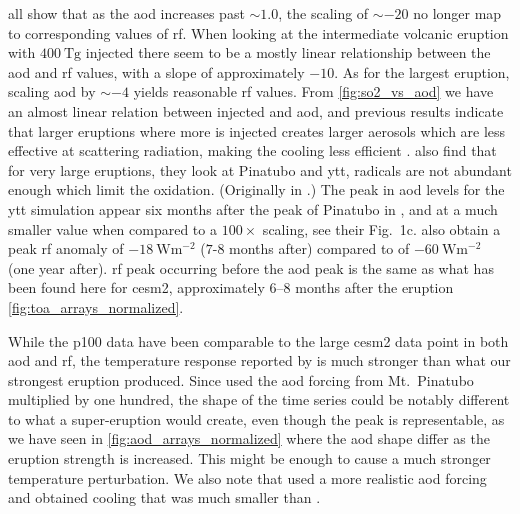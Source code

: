 \documentclass{ametsocV5}
\newcommand{\iso}[1][i]{{#1}njected \ce{SO2}}
\begin{document}
all show that as the \ac{aod} increases past \(\sim 1.0\), the scaling of \(\sim -20\)
no longer map to corresponding values of \ac{rf}. When looking at the intermediate
volcanic eruption with \(\SI{400}{\tera\gram}\) \iso{} there seem to be a mostly linear
relationship between the \ac{aod} and \ac{rf} values, with a slope of approximately
\(-10\). As for the largest eruption, scaling \ac{aod} by \(\sim-4\) yields reasonable
\ac{rf} values. From \cref{fig:so2_vs_aod} we have an almost linear relation between
\iso{} and \ac{aod}, and previous results indicate that larger eruptions where more
 is injected creates larger aerosols which are less effective at scattering
radiation, making the cooling less efficient
\citep{english2013,timmreck2010,timmreck2018}. \citet{timmreck2010} also find that for
very large eruptions, they look at Pinatubo and \ac{ytt},  radicals are not
abundant enough which limit the  oxidation. (Originally in \citep{bekki1995}.)
The peak in \ac{aod} levels for the \ac{ytt} simulation appear six months after the peak
of Pinatubo in \citet{timmreck2010}, and at a much smaller value when compared to a
\(100\times\) scaling, see their Fig.\ 1c. \citet{timmreck2010} also obtain a peak
\ac{rf} anomaly of \(\SI{-18}{\watt\metre^{-2}}\) (\(7\)-\(8\) months after) compared to
\citet{jones2005} of \(\SI{-60}{\watt\metre^{-2}}\) (one year after). \ac{rf} peak
occurring before the \ac{aod} peak is the same as what has been found here for
\ac{cesm2}, approximately \(6\)--\(8\) months after the eruption
\cref{fig:toa_arrays_normalized}.

While the \ac{p100} data have been comparable to the large \ac{cesm2} data point in both
\ac{aod} and \ac{rf}, the temperature response reported by \citet{jones2005} is much
stronger than what our strongest eruption produced. Since \citet{jones2005} used the
\ac{aod} forcing from Mt.\ Pinatubo multiplied by one hundred, the shape of the time
series could be notably different to what a super-eruption would create, even though the
peak is representable, as we have seen in \cref{fig:aod_arrays_normalized} where the
\ac{aod} shape differ as the eruption strength is increased. This might be enough to
cause a much stronger temperature perturbation. We also note that \citet{timmreck2010}
used a more realistic \ac{aod} forcing and obtained cooling that was much smaller than
\citet{jones2005}.
\end{document}

